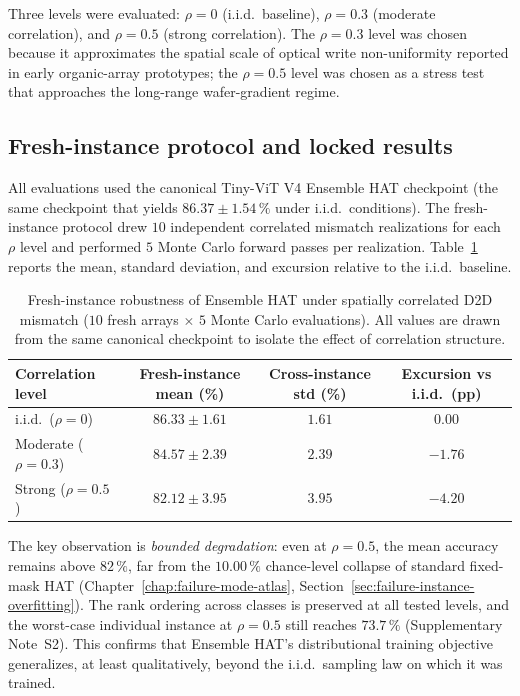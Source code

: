 Three levels were evaluated: $\rho=0$ (i.i.d.~baseline), $\rho=0.3$ (moderate correlation), and $\rho=0.5$ (strong correlation).  The $\rho=0.3$ level was chosen because it approximates the spatial scale of optical write non-uniformity reported in early organic-array prototypes; the $\rho=0.5$ level was chosen as a stress test that approaches the long-range wafer-gradient regime.

\subsection{Fresh-instance protocol and locked results}

All evaluations used the canonical Tiny-ViT V4 Ensemble HAT checkpoint (the same checkpoint that yields $86.37\pm1.54\,\%$ under i.i.d.~conditions).  The fresh-instance protocol drew $10$ independent correlated mismatch realizations for each $\rho$ level and performed $5$ Monte Carlo forward passes per realization.  Table~\ref{tab:correlated-d2d-full} reports the mean, standard deviation, and excursion relative to the i.i.d.~baseline.

\begin{table}[ht]
    \centering
    \caption{Fresh-instance robustness of Ensemble HAT under spatially correlated D2D mismatch ($10$ fresh arrays $\times$ $5$ Monte Carlo evaluations).  All values are drawn from the same canonical checkpoint to isolate the effect of correlation structure.}
    \label{tab:correlated-d2d-full}
    \small
    \setlength{\tabcolsep}{6pt}
    \begin{tabular}{@{}lccc@{}}
        \toprule
        Correlation level & Fresh-instance mean (\%) & Cross-instance std (\%) & Excursion vs i.i.d.~(pp) \\
        \midrule
        i.i.d.~($\rho=0$)   & $86.33\pm1.61$ & $1.61$ & $0.00$ \\
        Moderate ($\rho=0.3$) & $84.57\pm2.39$ & $2.39$ & $-1.76$ \\
        Strong ($\rho=0.5$)   & $82.12\pm3.95$ & $3.95$ & $-4.20$ \\
        \bottomrule
    \end{tabular}
\end{table}

The key observation is \emph{bounded degradation}: even at $\rho=0.5$, the mean accuracy remains above $82\,\%$, far from the $10.00\,\%$ chance-level collapse of standard fixed-mask HAT (Chapter~\ref{chap:failure-mode-atlas}, Section~\ref{sec:failure-instance-overfitting}).  The rank ordering across classes is preserved at all tested levels, and the worst-case individual instance at $\rho=0.5$ still reaches $73.7\,\%$ (Supplementary Note~S2).  This confirms that Ensemble HAT's distributional training objective generalizes, at least qualitatively, beyond the i.i.d.~sampling law on which it was trained.

